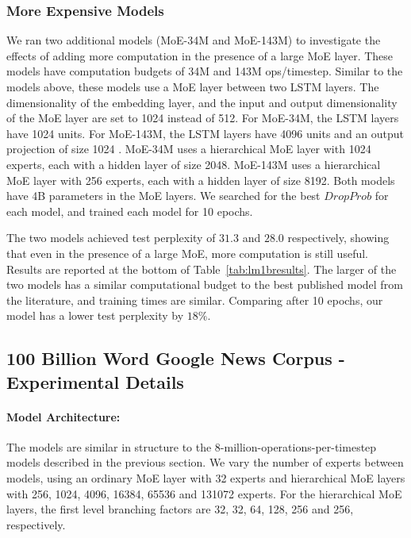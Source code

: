 \documentclass{article} %
\begin{document}
\subsubsection{More Expensive Models}\label{sec:expensive}

We ran two additional models (MoE-34M and MoE-143M) to investigate the effects of adding more computation in the presence of a large MoE layer.  These models have computation budgets of 34M and 143M ops/timestep.   Similar to the models above, these models use a MoE layer between two LSTM layers.  The dimensionality of the embedding layer, and the input and output dimensionality of the MoE layer are set to 1024 instead of 512.  For MoE-34M, the LSTM layers have 1024 units.  For MoE-143M, the LSTM layers have 4096 units and an output projection of size 1024  \citep{sak2014long}.  MoE-34M uses a hierarchical MoE layer with 1024 experts, each with a hidden layer of size 2048.   MoE-143M uses a hierarchical MoE layer with 256 experts, each with a hidden layer of size 8192.  Both models have 4B parameters in the MoE layers.  We searched for the best $DropProb$ for each model, and trained each model for 10 epochs.

The two models achieved test perplexity of $31.3$ and $28.0$ respectively, showing that even in the presence of a large MoE, more computation is still useful.  Results are reported at the bottom of Table~\ref{tab:lm1bresults}.   The larger of the two models has a similar computational budget to the best published model from the literature, and training times are similar.  Comparing after 10 epochs, our model has a lower test perplexity by $18\%$. 


\subsection{100 Billion Word Google News Corpus - Experimental Details}\label{sec:appendixgn11}


\paragraph{Model Architecture:}  The models are similar in structure to the 8-million-operations-per-timestep models described in the previous section.   We vary the number of experts between models, using an ordinary MoE layer with 32 experts and hierarchical MoE layers with 256, 1024, 4096, 16384, 65536 and 131072 experts.   For the hierarchical MoE layers, the first level branching factors are 32, 32, 64, 128, 256 and 256, respectively.
\end{document}
